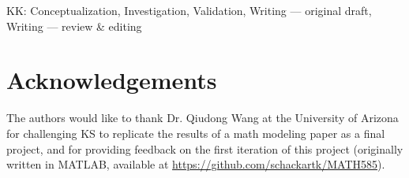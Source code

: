 \noindent KK: Conceptualization, Investigation, Validation, Writing — original draft,
Writing — review \& editing

\section{Acknowledgements}

The authors would like to thank Dr. Qiudong Wang at the University of Arizona for
challenging KS to replicate the results of a math modeling paper as a final project, and
for providing feedback on the first iteration of this project (originally written
in MATLAB, available at \url{https://github.com/schackartk/MATH585}).


